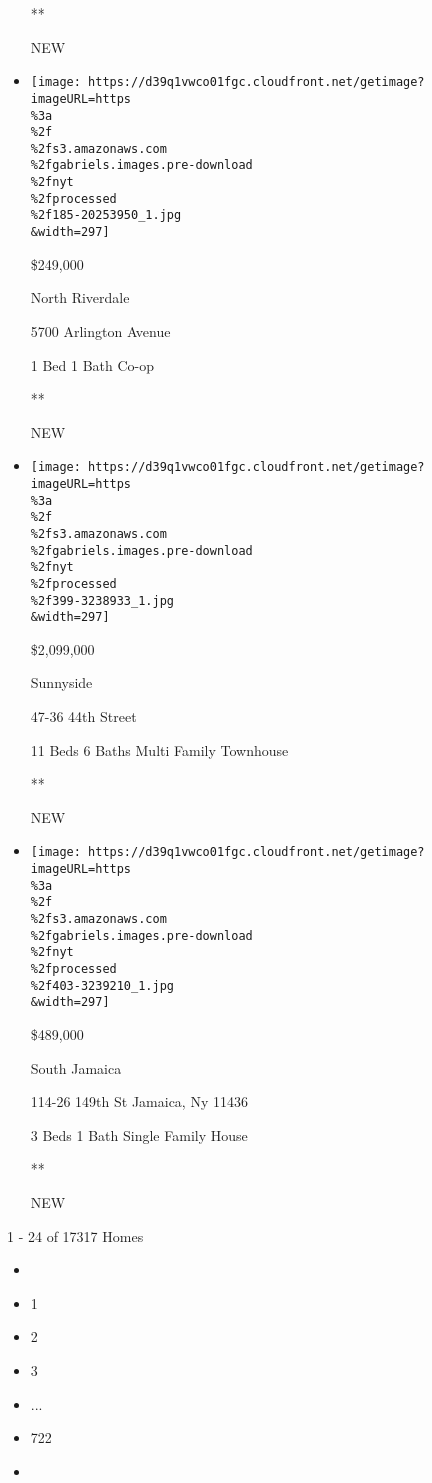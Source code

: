 \begin{itemize}
  **

  NEW
\item
  \href{/real-estate/usa/ny/bronx/north-riverdale/homes-for-sale/5700-arlington-avenue/185-20253950?}{}

  \texttt{[image: https://d39q1vwco01fgc.cloudfront.net/getimage?imageURL=https\\\%3a\\\%2f\\\%2fs3.amazonaws.com\\\%2fgabriels.images.pre-download\\\%2fnyt\\\%2fprocessed\\\%2f185-20253950\_1.jpg\\\&width=297]}

  \$249,000

  North Riverdale

  5700 Arlington Avenue

  1 Bed \textbar{} 1 Bath \textbar{} Co-op

  **

  NEW
\item
  \href{/real-estate/usa/ny/queens/sunnyside/homes-for-sale/47-36-44th-street/399-3238933?}{}

  \texttt{[image: https://d39q1vwco01fgc.cloudfront.net/getimage?imageURL=https\\\%3a\\\%2f\\\%2fs3.amazonaws.com\\\%2fgabriels.images.pre-download\\\%2fnyt\\\%2fprocessed\\\%2f399-3238933\_1.jpg\\\&width=297]}

  \$2,099,000

  Sunnyside

  47-36 44th Street

  11 Beds \textbar{} 6 Baths \textbar{} Multi Family Townhouse

  **

  NEW
\item
  \href{/real-estate/usa/ny/queens/south-jamaica/homes-for-sale/114-26-149th-st-jamaica-ny-11436/403-3239210?}{}

  \texttt{[image: https://d39q1vwco01fgc.cloudfront.net/getimage?imageURL=https\\\%3a\\\%2f\\\%2fs3.amazonaws.com\\\%2fgabriels.images.pre-download\\\%2fnyt\\\%2fprocessed\\\%2f403-3239210\_1.jpg\\\&width=297]}

  \$489,000

  South Jamaica

  114-26 149th St Jamaica, Ny 11436

  3 Beds \textbar{} 1 Bath \textbar{} Single Family House

  **

  NEW
\end{itemize}

1 - 24 of 17317 Homes

\begin{itemize}
\item
\item
  1
\item
  2
\item
  3
\item
  ...
\item
  722
\item
\end{itemize}

